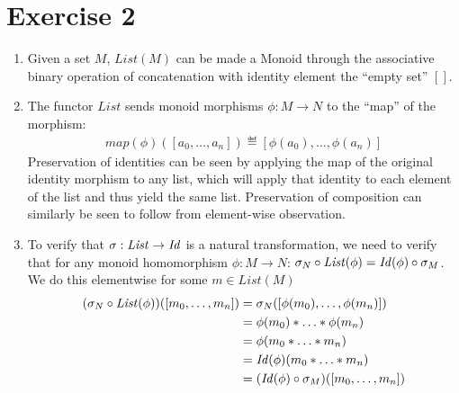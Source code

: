 \documentclass{article}
\begin{document}
\section*{Exercise 2}
\newcommand{\List}{\mathit{List}}
\newcommand{\mon}{\mathbf{Mon}}
\begin{enumerate}
\item Given a set $M$, $\List(M)$ can be made a Monoid through the associative binary operation of concatenation with identity element the ``empty set'' $[]$.
\item The functor $\List$ sends monoid morphisms $\phi: M \to N$ to the ``map'' of the morphism:
  \begin{align*}
    \mathit{map}(\phi)([a_0, \ldots, a_n]) \eqdef [\phi(a_0), \ldots, \phi(a_n)]
  \end{align*}
  Preservation of identities can be seen by applying the map of the original identity morphism to any list, which will apply that identity to each element of the list and thus yield the same list. Preservation of composition can similarly be seen to follow from element-wise observation.
  \renewcommand{\Id}{\mathit{Id}}
\item To verify that $\s: \List \to \Id$ is a natural transformation, we need to verify that for any monoid homomorphism $\phi: M \to N$: $\s_N \circ \List(\phi)= \Id(\phi) \circ \s_M$. We do this elementwise for some $m \in \List(M)$
  \begin{align*}
    (\s_N \circ \List(\phi))([m_0, \ldots, m_n]) &= \s_N([\phi(m_0), \ldots, \phi(m_n)]) \\
                                                 &= \phi(m_0) * \ldots * \phi(m_n) \\
                                                 &= \phi(m_0 * \ldots * m_n) \\
                                                 &= \Id(\phi)(m_0 * \ldots * m_n) \\
                                                 &= (\Id(\phi) \circ \s_M)([m_0, \ldots, m_n])
  \end{align*}
\end{enumerate}
\end{document}
